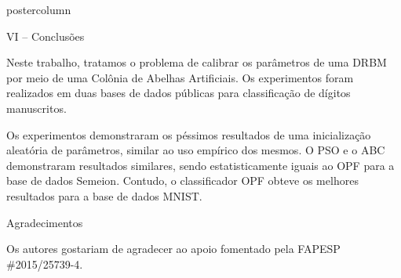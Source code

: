 \documentclass[final,hyperref={pdfpagelabels=false}]{beamer}
\begin{document}
\begin{frame}
\begin{columns}
\begin{column}{.54\textwidth}
\begin{beamercolorbox}[center,wd=\textwidth]{postercolumn}
\begin{minipage}[T]{.95\textwidth}
{	 \begin{block}{\vspace*{-7pt} \large VI -- Conclusões}
	    \begin{itemize}
	     {\small \item Neste trabalho, tratamos o problema de calibrar os parâmetros de uma DRBM por meio de uma Colônia de Abelhas Artificiais. Os experimentos foram realizados em duas bases de dados públicas para classificação de dígitos manuscritos.

		\item Os experimentos demonstraram os péssimos resultados de uma inicialização aleatória de parâmetros, similar ao uso empírico dos mesmos. O PSO e o ABC demonstraram resultados similares, sendo estatisticamente iguais ao OPF para a base de dados Semeion. Contudo, o classificador OPF obteve os melhores resultados para a base de dados MNIST.}
		
	     \end{itemize}
	     \end{block}
	     
	 
\vspace*{8pt}
        \begin{block}{\vspace*{-7pt} \large Agradecimentos}
		
		{\small Os autores gostariam de agradecer ao apoio fomentado pela FAPESP \#2015/25739-4.}
		\end{block}	

\vspace*{8pt}

	

   }
        \end{minipage}
      \end{beamercolorbox}
    \end{column}
  \end{columns}

\end{frame}
\end{document}
